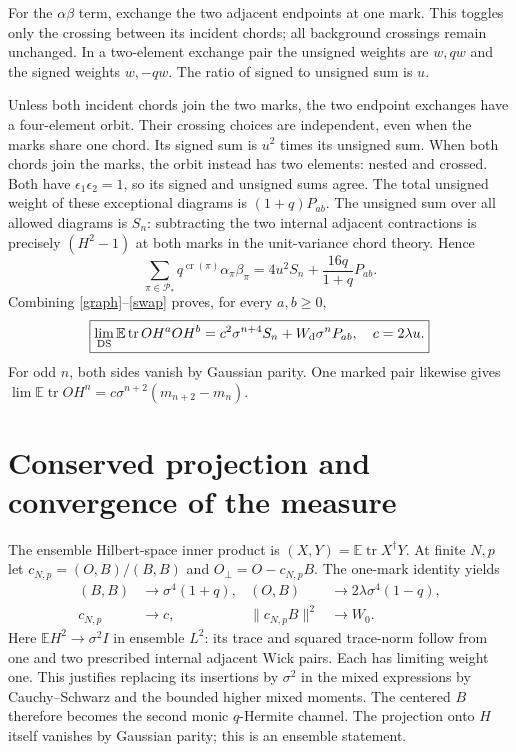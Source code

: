 \documentclass[11pt,a4paper]{article}
\newcommand{\tr}{\operatorname{tr}}
\newcommand{\E}{\mathbb E}
\begin{document}
For the $\alpha\beta$ term, exchange the two adjacent endpoints at
one mark. This toggles only the crossing between its incident chords;
all background crossings remain unchanged. In a two-element exchange
pair the unsigned weights are $w,qw$ and the signed weights $w,-qw$.
The ratio of signed to unsigned sum is $u$.

Unless both incident chords join the two marks, the two endpoint
exchanges have a four-element orbit. Their crossing choices are independent,
even when the marks share one chord. Its signed sum is $u^2$ times
its unsigned sum. When both chords join the marks, the orbit instead
has two elements: nested and crossed. Both have
$\epsilon_1\epsilon_2=1$, so its signed and unsigned sums agree.
The total unsigned weight of these exceptional diagrams is
$(1+q)P_{ab}$. The unsigned sum over all allowed diagrams is $S_n$:
subtracting the two internal adjacent contractions is precisely
$(H^2-1)$ at both marks in the unit-variance chord theory. Hence
\begin{equation}
 \sum_{\pi\in\mathcal P_*}q^{\operatorname{cr}(\pi)}\alpha_\pi\beta_\pi
 =4u^2S_n+\frac{16q}{1+q}P_{ab}.\label{swap}
\end{equation}
Combining \eqref{graph}--\eqref{swap} proves, for every $a,b\ge0$,
\begin{equation}\boxed{
 \lim_{\rm DS}\E\tr O H^a O H^b
 =c^2\sigma^{n+4}S_n+W_{\rm d}\sigma^nP_{ab},\quad c=2\lambda u.}\label{mixed}
\end{equation}
For odd $n$, both sides vanish by Gaussian parity. One marked pair
likewise gives
$\lim\E\tr O H^n=c\sigma^{n+2}(m_{n+2}-m_n)$.

\newpage
\section{Conserved projection and convergence of the measure}
The ensemble Hilbert-space inner product is
$(X,Y)=\E\tr X^\dagger Y$. At finite $N,p$ let
$c_{N,p}=(O,B)/(B,B)$ and $O_\perp=O-c_{N,p}B$.
The one-mark identity yields
\begin{align}
 (B,B)&\longrightarrow\sigma^4(1+q),&
 (O,B)&\longrightarrow2\lambda\sigma^4(1-q),\\
 c_{N,p}&\longrightarrow c,&
 \|c_{N,p}B\|^2&\longrightarrow W_0.\label{projection}
\end{align}
Here $\E H^2\to\sigma^2 I$ in ensemble $L^2$: its trace and squared
trace-norm follow from one and two prescribed internal adjacent Wick
pairs. Each has limiting weight one. This justifies replacing its
insertions by $\sigma^2$ in the mixed expressions by Cauchy--Schwarz
and the bounded higher mixed moments. The centered $B$ therefore becomes
the second monic $q$-Hermite channel. The projection onto $H$ itself
vanishes by Gaussian parity; this is an ensemble statement.
\end{document}
